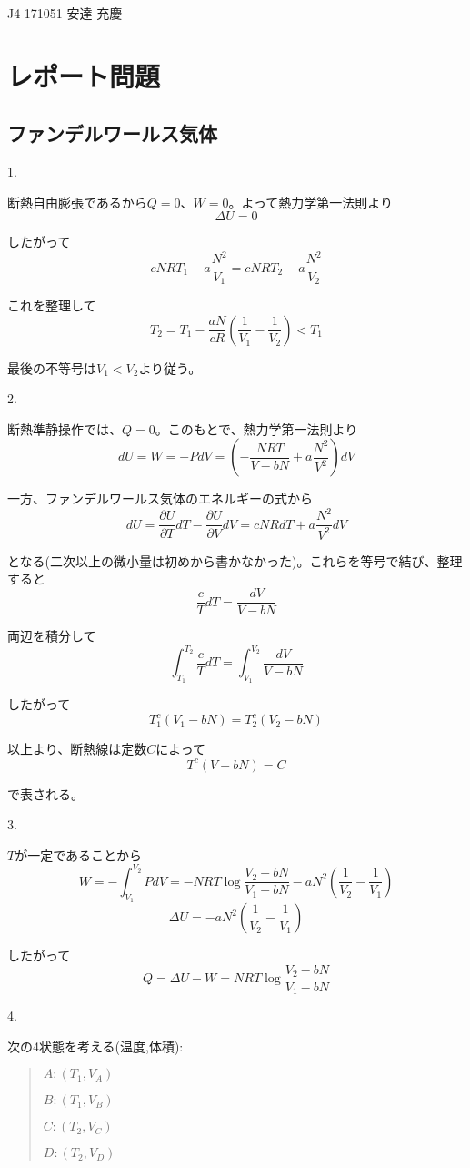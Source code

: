 \documentclass{jsarticle}
\begin{document}
{\Large J4-171051 安達 充慶}

\section{レポート問題}

\subsection{ファンデルワールス気体}
1.

断熱自由膨張であるから$Q=0$、$W=0$。よって熱力学第一法則より
\[ \Delta U=0 \]

したがって
\[ cNRT_1-a\frac{N^2}{V_1}=cNRT_2-a\frac{N^2}{V_2} \]

これを整理して
\[ T_2=T_1-\frac{aN}{cR}\left( \frac{1}{V_1}-\frac{1}{V_2} \right)<T_1 \]

最後の不等号は$V_1<V_2$より従う。

2.

断熱準静操作では、$Q=0$。このもとで、熱力学第一法則より
\[ dU=W=-PdV=\left(-\frac{NRT}{V-bN}+a\frac{N^2}{V^2}\right)dV \]

一方、ファンデルワールス気体のエネルギーの式から
\[dU=\frac{\partial U}{\partial T} dT-\frac{\partial U}{\partial V}dV=cNRdT+a\frac{N^2}{V^2}dV \]

となる(二次以上の微小量は初めから書かなかった)。これらを等号で結び、整理すると
\[ \frac{c}{T}dT=\frac{dV}{V-bN} \]

両辺を積分して
\[ \int_{T_1}^{T_2} \frac{c}{T}dT=\int_{V_1}^{V_2} \frac{dV}{V-bN} \]

したがって
\[ T_1^c \left(V_1-bN\right)=T_2^c \left(V_2-bN\right) \]

以上より、断熱線は定数$C$によって
\[ T^c \left(V-bN\right)=C \]

で表される。

3.

$T$が一定であることから
\[ W=-\int_{V_1}^{V_2} PdV=-NRT\log \frac{V_2-bN}{V_1-bN} -aN^2\left(\frac{1}{V_2}-\frac{1}{V_1}\right) \]
\[ \Delta U=-aN^2\left(\frac{1}{V_2}-\frac{1}{V_1}\right) \]

したがって
\[ Q=\Delta U-W=NRT\log \frac{V_2-bN}{V_1-bN} \]

4.

次の4状態を考える(温度,体積):

\begin{quotation}
$A:\left(T_1,V_A\right)$

$B:\left(T_1,V_B\right)$

$C:\left(T_2,V_C\right)$

$D:\left(T_2,V_D\right)$
\end{quotation}
\end{document}
